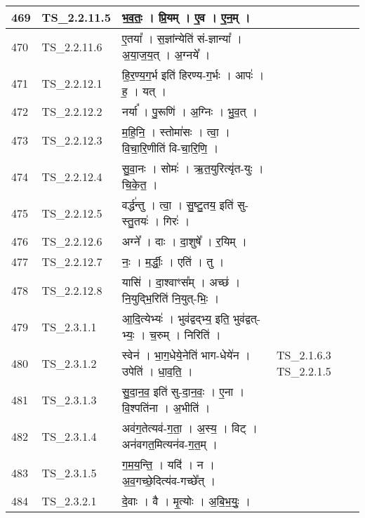 \documentclass[17pt]{extarticle}
\begin{document}
\begin{longtable}{||p{0.4in}||p{0.9in}||p{4.0in}||p{0.9in}||}
        \hline
            469 & TS\_2.2.11.5 & भ॒व॒तः॒   ।   प्रि॒यम्   ।   ए॒व   ।   ए॒न॒म्   ।    &      \\
        \hline
            470 & TS\_2.2.11.6 & ए॒तया᳚   ।   स॒ज्ञांन्येति॑ सं{-}ज्ञान्या᳚   ।   अ॒या॒ज॒य॒त्   ।   अ॒ग्नये᳚   ।    &      \\
        \hline
            471 & TS\_2.2.12.1 & हि॒र॒ण्य॒ग॒र्भ इति॑ हिरण्य{-}ग॒र्भः   ।   आपः॑   ।   ह॒   ।   यत्   ।    &      \\
        \hline
            472 & TS\_2.2.12.2 & नर्या᳚   ।   पु॒रूणि॑   ।   अ॒ग्निः   ।   भु॒व॒त्   ।    &      \\
        \hline
            473 & TS\_2.2.12.3 & म॒हि॒नि॒   ।   स्तोमा॑सः   ।   त्वा॒   ।   वि॒चा॒रि॒णीति॑ वि{-}चा॒रि॒णि॒   ।    &      \\
        \hline
            474 & TS\_2.2.12.4 & सु॒वा॒नः   ।   सोमः॑   ।   ऋ॒त॒युरित्यृ॑त{-}युः   ।   चि॒के॒त॒   ।    &      \\
        \hline
            475 & TS\_2.2.12.5 & वर्द्ध॑न्तु   ।   त्वा॒   ।   सु॒ष्टु॒तय॒ इति॑ सु{-}स्तु॒तयः॑   ।   गिरः॑   ।    &      \\
        \hline
            476 & TS\_2.2.12.6 & अग्ने᳚   ।   दाः   ।   दा॒शुषे᳚   ।   र॒यिम्   ।    &      \\
        \hline
            477 & TS\_2.2.12.7 & नः॒   ।   म॒र्द्धीः॒   ।   एति॑   ।   तु   ।    &      \\
        \hline
            478 & TS\_2.2.12.8 & यासि॑   ।   दा॒श्वाꣳस᳚म्   ।   अच्छ॑   ।   नि॒युद्भि॒रिति॑ नि॒युत्{-}भिः॒   ।    &      \\
        \hline
            479 & TS\_2.3.1.1 & आ॒दि॒त्येभ्यः॑   ।   भुव॑द्वद्भ्य॒ इति॒ भुव॑द्वत्{-}भ्यः॒   ।   च॒रुम्   ।   निरिति॑   ।    &      \\
        \hline
            480 & TS\_2.3.1.2 & स्वेन॑   ।   भा॒ग॒धेये॒नेति॑ भाग{-}धेये॑न   ।   उपेति॑   ।   धा॒व॒ति॒   ।    & TS\_2.1.6.3 TS\_2.2.1.5        \\
        \hline
            481 & TS\_2.3.1.3 & सु॒दा॒न॒व॒ इति॑ सु{-}दा॒न॒वः॒   ।   ए॒ना   ।   वि॒श्पति॑ना   ।   अ॒भीति॑   ।    &      \\
        \hline
            482 & TS\_2.3.1.4 & अव॑ग॒तेत्यव॑{-}ग॒ता॒   ।   अ॒स्य॒   ।   विट्   ।   अन॑वगत॒मित्यन॑व{-}ग॒त॒म्   ।    &      \\
        \hline
            483 & TS\_2.3.1.5 & ग॒म॒य॒न्ति॒   ।   यदि॑   ।   न   ।   अ॒व॒गच्छे॒दित्य॑व{-}गच्छे᳚त्   ।    &      \\
        \hline
            484 & TS\_2.3.2.1 & दे॒वाः   ।   वै   ।   मृ॒त्योः   ।   अ॒बि॒भ॒युः॒   ।    &      \\

\end{longtable}
\end{document}
